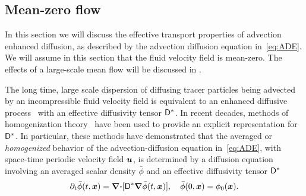 \documentclass[amsa]{ipart}
\begin{document}
\subsection{Mean-zero flow}\label{sec:Mean_zero_flow}
%
In this section we will discuss the effective transport properties of
advection enhanced diffusion, as described by the advection diffusion
equation in~\eqref{eq:ADE}. We will assume in this section that the
fluid velocity field is mean-zero. The effects of a large-scale mean
flow will be discussed in . 




The long time, large scale dispersion of diffusing tracer particles
being advected by an incompressible fluid velocity field is equivalent
to an enhanced diffusive process~\cite{Taylor:PRSL:196} with an
effective diffusivity tensor $\mathsf{D}^*$. In recent decades, methods of
homogenization
theory~\cite{McLaughlin:SIAM_JAM:780,Fannjiang:1994:SIAM_JAM:333,Novikov:2005:CPAM:867,Majda:Kramer:1999:book}
have been used to provide an explicit representation for
$\mathsf{D}^*$. In particular, these methods have demonstrated that the
averaged or \emph{homogenized} behavior of the advection-diffusion
equation in~\eqref{eq:ADE}, with space-time periodic velocity field
$\boldsymbol{u}$, is determined by a diffusion equation
involving an averaged scalar density $\bar{\phi}$ and an
effective diffusivity tensor
$\mathsf{D}^*$~\cite{Majda:Kramer:1999:book}       
%
\begin{align}\label{eq:phi_bar}
 \partial_t\bar{\phi}(t,\vecx)=\bnabla\bcdot[\Dm^*\bnabla \bar{\phi}(t,\vecx)], \quad
  \bar{\phi}(0,\vecx)=\phi_0(\vecx).
\end{align}
\end{document}
